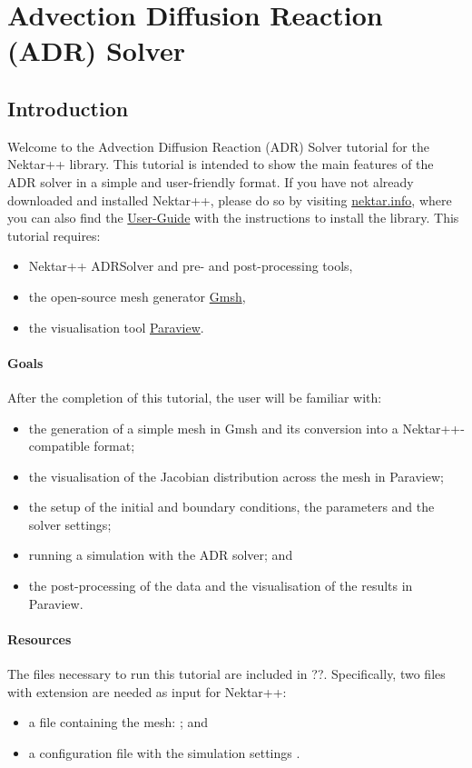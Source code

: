 \chapter{Advection Diffusion Reaction (ADR) Solver}
\label{ADR}

\section*{\Large Introduction}
Welcome to the Advection Diffusion Reaction (ADR) Solver tutorial for
the Nektar++ library.  This tutorial is intended to show the main
features of the ADR solver in a simple and user-friendly format. If
you have not already downloaded and installed Nektar++, please do
so by visiting \href{http://www.nektar.info}{nektar.info}, where you
can also find the
\href{http://www.nektar.info/downloads/8}{User-Guide} with the
instructions to install the library. This tutorial requires:
\begin{itemize}
    \item Nektar++ ADRSolver and pre- and post-processing tools,
    \item the open-source mesh generator \href{http://geuz.org/gmsh/}{Gmsh},
    \item the visualisation tool \href{http://www.paraview.org}{Paraview}.
\end{itemize}

\subsubsection*{Goals}
After the completion of this tutorial, the user will be familiar with:
\vspace{-0.5cm}
\begin{itemize}
\item the generation of a simple mesh in Gmsh and its conversion into a Nektar++-compatible format;
\item the visualisation of the Jacobian distribution across the mesh in Paraview;
\item the setup of the initial and boundary conditions, the parameters and the solver settings;
\item running a simulation with the ADR solver; and
\item the post-processing of the data and the visualisation of the results in Paraview.
\end{itemize}

\subsubsection*{Resources}
The files necessary to run this tutorial are included in ??.  
Specifically, two files with extension  are needed as input for Nektar++: 
\vspace{-0.5cm}
\begin{itemize}
\item a file containing the mesh: ; and 
\item a configuration file with the simulation settings .
\end{itemize}

